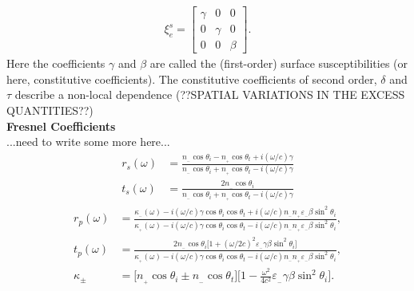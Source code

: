 \begin{align}
\xi ^s_e = 
\begin{bmatrix}
   \gamma   &   0       &  0      \\
   0        &   \gamma  &  0      \\
   0        &   0       &  \beta 
\end{bmatrix}
.
\end{align}
Here the coefficients $\gamma$ and $\beta$ are called the (first-order) surface susceptibilities (or here, constitutive coefficients). The constitutive coefficients of second order, $\delta$ and $\tau$ describe
a non-local dependence (??SPATIAL VARIATIONS IN THE EXCESS QUANTITIES??) \\
\textbf{Fresnel Coefficients} \\
...need to write some more here...
\begin{subequations}
   \label{fresCoeffS}
\begin{align}
   r_s(\omega) &= \frac{n\!_{_-} \cos \theta_i - n\!_{_+} \cos \theta_t + i(\omega/c) \gamma}{n\!_{_-} \cos \theta_i + n\!_{_+} \cos \theta_t - i(\omega/c) \gamma} \label{fresCoeffS1} \\
   t_s(\omega) &= \frac{2 n\!_{_-} \cos \theta_i}{n\!_{_-} \cos \theta_i + n\!_{_+} \cos \theta_t - i(\omega/c) \gamma} \label{fresCoeffS2}
\end{align}
\end{subequations}
%
\begin{subequations}
\label{fresCoeffP}
\begin{align}
   r_p(\omega) &= \frac{\kappa\!_{_-}(\omega) -i(\omega / c) \gamma \cos \theta_i \cos \theta_t + i(\omega/c)n\!_{_-} n\!_{_+} \varepsilon\!_{_-}\beta\sin^2 \theta_i }
   {\kappa\!_{_+}(\omega) -i(\omega / c) \gamma \cos \theta_i \cos \theta_t - i(\omega/c) n\!_{_-} n\!_{_+} \varepsilon\!_{_-} \beta \sin^2 \theta_i }, \label{fresCoeffS1}\\
   t_p(\omega) &= \frac{2n\!_{_-} \cos \theta_i \big[ 1 + (\omega/2c)^2 \varepsilon\!_{_-} \gamma \beta \sin ^2 \theta_i \big]}
   {\kappa\!_{_+}(\omega) -i(\omega / c) \gamma \cos \theta_i \cos \theta_t - i(\omega/c) n\!_{_-} n\!_{_+} \varepsilon\!_{_-} \beta \sin^2 \theta_i }, \label{fresCoeffS2}\\
   \kappa\!_{\pm} &= \big[ n\!_{_+} \cos \theta _i \pm n\!_{_-} \cos \theta_t  \big]\Bigg[ 1 - \frac{\omega^2}{4c^2} \varepsilon\!_{_-} \gamma \beta \sin ^2 \theta_i \Bigg]. \label{fresCoeffS3}
\end{align}
\end{subequations}
